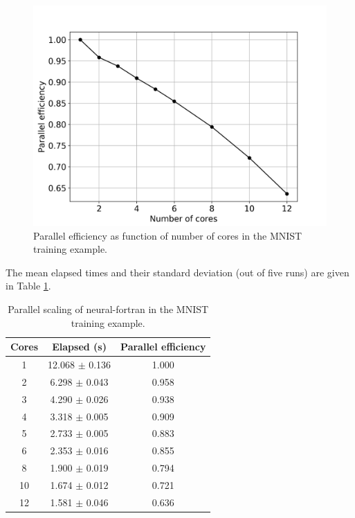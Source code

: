 \documentclass[sigplan, review=false, screen=true, balance=true]{acmart}
\begin{document}
\begin{figure}[H]
  \centering
  \includegraphics[width=\columnwidth]{../figures/nf-parallel-efficiency.png}
  \caption{Parallel efficiency as function of number of cores in the MNIST training example.}
  \label{fig_mnist_efficiency}
\end{figure}

The mean elapsed times and their standard deviation (out of five runs) are
given in Table \ref{table_parallel}.

\begin{center}
\begin{table}[h]
\caption{Parallel scaling of neural-fortran in the MNIST training example.}
\label{table_parallel}
\begin{tabular}{c|c|c}
  \hline
  Cores & Elapsed (s) & Parallel efficiency \\
  \hline
  1 & 12.068 $\pm$ 0.136 & 1.000 \\
  2 & 6.298 $\pm$ 0.043 & 0.958 \\
  3 & 4.290 $\pm$ 0.026 & 0.938 \\
  4 & 3.318 $\pm$ 0.005 & 0.909 \\
  5 & 2.733 $\pm$ 0.005 & 0.883 \\
  6 & 2.353 $\pm$ 0.016 & 0.855 \\
  8 & 1.900 $\pm$ 0.019 & 0.794 \\
  10 & 1.674 $\pm$ 0.012 & 0.721 \\
  12 & 1.581 $\pm$ 0.046 & 0.636 \\
  \hline
\end{tabular}
\end{table}
\end{center}
\end{document}

